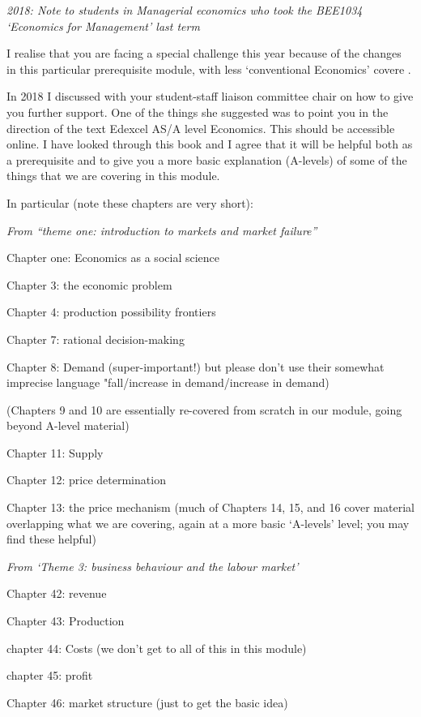 \documentclass[]{article}
\begin{document}
\bigskip

\emph{2018: Note to students in Managerial economics who took the BEE1034 `Economics for Management' last term}

I realise that you are facing a special challenge this year because of the changes in this particular prerequisite module, with less `conventional Economics' covere .

In 2018 I discussed with your student-staff liaison committee chair on how to give you further support. One of the things she suggested was to point you in the direction of the text Edexcel AS/A level Economics. This should be accessible online. I have looked through this book and I agree that it will be helpful both as a prerequisite and to give you a more basic explanation (A-levels) of some of the things that we are covering in this module.

In particular (note these chapters are very short):

\emph{From ``theme one: introduction to markets and market failure''}

Chapter one: Economics as a social science

Chapter 3: the economic problem

Chapter 4: production possibility frontiers

Chapter 7: rational decision-making

Chapter 8: Demand (super-important!) but please don't use their somewhat imprecise language "fall/increase in demand/increase in demand)

(Chapters 9 and 10 are essentially re-covered from scratch in our module, going beyond A-level material)

\bigskip

Chapter 11: Supply

Chapter 12: price determination

Chapter 13: the price mechanism
(much of Chapters 14, 15, and 16 cover material overlapping what we are covering, again at a more basic `A-levels' level; you may find these helpful)

\emph{From `Theme 3: business behaviour and the labour market'}

Chapter 42: revenue

Chapter 43: Production

chapter 44: Costs (we don't get to all of this in this module)

chapter 45: profit

Chapter 46: market structure (just to get the basic idea)
\end{document}
